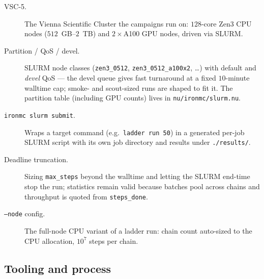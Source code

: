 \documentclass[11pt]{article}
\newcommand{\term}[1]{\item[#1.]}
\begin{document}
\begin{description}
\term{VSC-5} The Vienna Scientific Cluster the campaigns run on: $128$-core Zen3 CPU
  nodes ($512$~GB--$2$~TB) and $2\times$A100 GPU nodes, driven via SLURM.

\term{Partition / QoS / devel} SLURM node classes (\texttt{zen3\_0512},
  \texttt{zen3\_0512\_a100x2}, \dots) with default and \emph{devel} QoS --- the devel
  queue gives fast turnaround at a fixed $10$-minute walltime cap; smoke- and
  scout-sized runs are shaped to fit it. The partition table (including GPU counts)
  lives in \texttt{nu/ironmc/slurm.nu}.

\term{\texttt{ironmc slurm submit}} Wraps a target command (e.g.\
  \texttt{ladder run 50}) in a generated per-job SLURM script with its own job
  directory and results under \texttt{./results/}.

\term{Deadline truncation} Sizing \texttt{max\_steps} beyond the walltime and letting
  the SLURM end-time stop the run; statistics remain valid because batches pool
  across chains and throughput is quoted from \texttt{steps\_done}.

\term{\texttt{--node} config} The full-node CPU variant of a ladder run: chain count
  auto-sized to the CPU allocation, $10^{7}$ steps per chain.
\end{description}

\subsection{Tooling and process}
\end{document}
